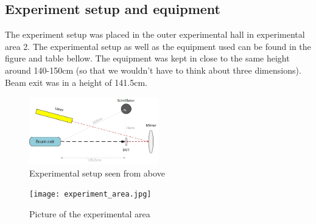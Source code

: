 \documentclass[12pt]{article}
\numberwithin{figure}{section}
\begin{document}
\subsection{Experiment setup and equipment}

The experiment setup was placed in the outer experimental hall in experimental area 2. The experimental setup as well as the equipment used can be found in the figure and table bellow.
The equipment was kept in close to the same height around 140-150cm (so that we wouldn't have to think about three dimensions). Beam exit was in a height of 141.5cm.

  \vspace{5mm}
  
\begin{figure}[!htbp]
\centering
  \centerline{\includegraphics[width=0.5\textwidth]{experiment_setup.jpg}}
  \caption{Experimental setup seen from above}
  \label{experiment_setup}
\end{figure}%

  \vspace{5mm}   
  
\begin{figure}[!htbp]
  \centering
  \texttt{[image: experiment\_area.jpg]}
  \caption{Picture of the experimental area}
  \label{experiment_area}
\end{figure}
\end{document}

